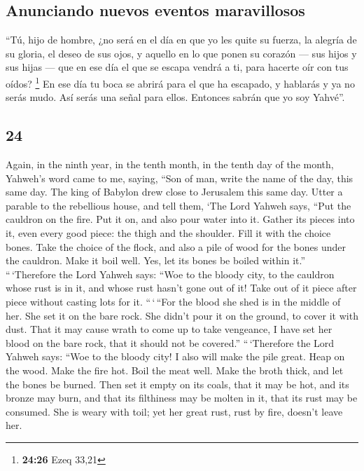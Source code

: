 \begin{paracol}{2}
\hypertarget{anunciando-nuevos-eventos-maravillosos}{%
\subsection{Anunciando nuevos eventos
maravillosos}\label{anunciando-nuevos-eventos-maravillosos}}

 ``Tú, hijo de hombre, ¿no será en el día en que yo les
quite su fuerza, la alegría de su gloria, el deseo de sus ojos, y
aquello en lo que ponen su corazón --- sus hijos y sus hijas ---
 que en ese día el que se escapa vendrá a ti, para
hacerte oír con tus oídos? \footnote{\textbf{24:26} Ezeq 33,21}
 En ese día tu boca se abrirá para el que ha escapado, y
hablarás y ya no serás mudo. Así serás una señal para ellos. Entonces
sabrán que yo soy Yahvé''.

\switchcolumn
\begin{otherlanguage}{english}

\hypertarget{section-47}{%
\section{24}\label{section-47}}

 Again, in the ninth year, in the tenth month, in the
tenth day of the month, Yahweh's word came to me, saying, 
``Son of man, write the name of the day, this same day. The king of
Babylon drew close to Jerusalem this same day.  Utter a
parable to the rebellious house, and tell them, `The Lord Yahweh says,
``Put the cauldron on the fire. Put it on, and also pour water into it.
 Gather its pieces into it, even every good piece: the
thigh and the shoulder. Fill it with the choice bones. 
Take the choice of the flock, and also a pile of wood for the bones
under the cauldron. Make it boil well. Yes, let its bones be boiled
within it.''  ``\,`Therefore the Lord Yahweh says: ``Woe
to the bloody city, to the cauldron whose rust is in it, and whose rust
hasn't gone out of it! Take out of it piece after piece without casting
lots for it.  ``\,`\,``For the blood she shed is in the
middle of her. She set it on the bare rock. She didn't pour it on the
ground, to cover it with dust.  That it may cause wrath to
come up to take vengeance, I have set her blood on the bare rock, that
it should not be covered.''  ``\,`Therefore the Lord
Yahweh says: ``Woe to the bloody city! I also will make the pile great.
 Heap on the wood. Make the fire hot. Boil the meat well.
Make the broth thick, and let the bones be burned.  Then
set it empty on its coals, that it may be hot, and its bronze may burn,
and that its filthiness may be molten in it, that its rust may be
consumed.  She is weary with toil; yet her great rust,
rust by fire, doesn't leave her.


\end{otherlanguage}
\end{paracol}
